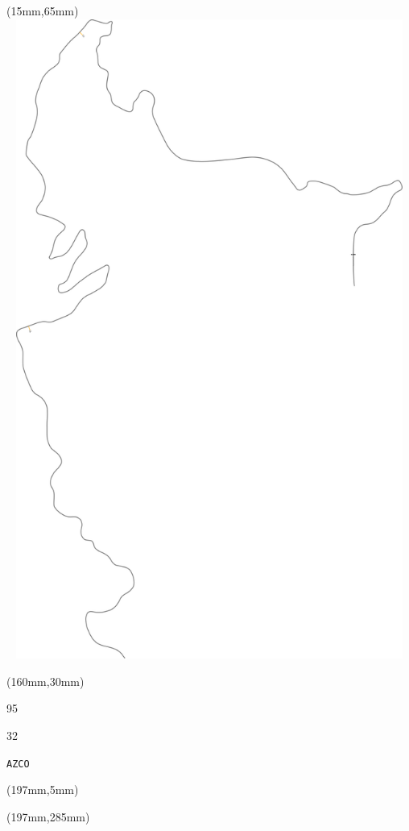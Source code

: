 \begin{textblock*}{185mm}(15mm,65mm)%
\centering
\mbox{\includegraphics[width=185mm,height=210mm,keepaspectratio]{PT/AZCO.pdf}}
\end{textblock*}
\begin{textblock*}{40mm}(160mm,30mm)%
\Large
\par{} 
\par95 
\par32 
\par\hfill\tiny\tt AZCO\\
\end{textblock*}
\begin{textblock*}{20mm}(197mm,5mm)%
\fbox{\thepage}
\label{AZCO}
\end{textblock*}
\begin{textblock*}{20mm}(197mm,285mm)%
\fbox{\thepage}
\end{textblock*}


